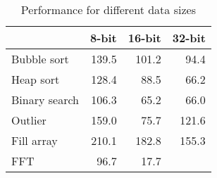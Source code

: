
\begin{table}[]
\centering
\caption{Performance for different data sizes}
\label{tbl-performance-8-16-32-bit}
\begin{tabular}{lrrr}
\toprule
               &   8-bit  &  16-bit  &     32-bit \\
\midrule
Bubble sort    &    139.5 &    101.2 &       94.4 \\
Heap sort      &    128.4 &     88.5 &       66.2 \\
Binary search  &    106.3 &     65.2 &       66.0 \\
Outlier        &    159.0 &     75.7 &      121.6 \\
Fill array     &    210.1 &    182.8 &      155.3 \\
FFT            &     96.7 &     17.7 &            \\
\bottomrule
\end{tabular}
\end{table}
